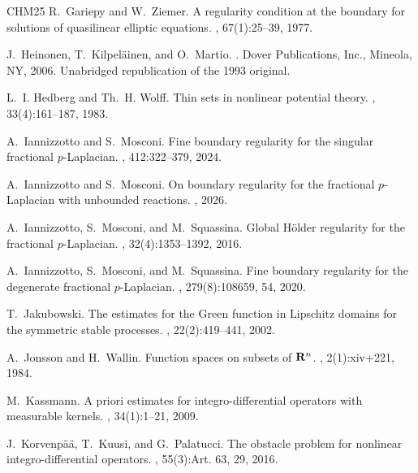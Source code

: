 \documentclass[11pt]{amsart}
\theoremstyle{plain}
\theoremstyle{definition}
\numberwithin{equation}{section}
\begin{document}
\begin{thebibliography}{CHM{\etalchar{+}}25}
R.~Gariepy and W.~Ziemer.
\newblock A regularity condition at the boundary for solutions of quasilinear
  elliptic equations.
, 67(1):25--39, 1977.

J.~Heinonen, T.~Kilpel\"ainen, and O.~Martio.
.
\newblock Dover Publications, Inc., Mineola, NY, 2006.
\newblock Unabridged republication of the 1993 original.

L.~I. Hedberg and Th.~H. Wolff.
\newblock Thin sets in nonlinear potential theory.
, 33(4):161--187, 1983.

A.~Iannizzotto and S.~Mosconi.
\newblock Fine boundary regularity for the singular fractional
  {$p$}-{L}aplacian.
, 412:322--379, 2024.

A.~Iannizzotto and S.~Mosconi.
\newblock On boundary regularity for the fractional $p$-{L}aplacian with
  unbounded reactions.
, 2026.

A.~Iannizzotto, S.~Mosconi, and M.~Squassina.
\newblock Global {H}\"older regularity for the fractional {$p$}-{L}aplacian.
, 32(4):1353--1392, 2016.

A.~Iannizzotto, S.~Mosconi, and M.~Squassina.
\newblock Fine boundary regularity for the degenerate fractional
  {$p$}-{L}aplacian.
, 279(8):108659, 54, 2020.

T.~Jakubowski.
\newblock The estimates for the {G}reen function in {L}ipschitz domains for the
  symmetric stable processes.
, 22(2):419--441, 2002.

A.~Jonsson and H.~Wallin.
\newblock Function spaces on subsets of {${\bf R}^n$}.
, 2(1):xiv+221, 1984.

M.~Kassmann.
\newblock A priori estimates for integro-differential operators with measurable
  kernels.
, 34(1):1--21, 2009.

J.~Korvenp\"a\"a, T.~Kuusi, and G.~Palatucci.
\newblock The obstacle problem for nonlinear integro-differential operators.
, 55(3):Art. 63, 29,
  2016.


\end{thebibliography}
\end{document}

